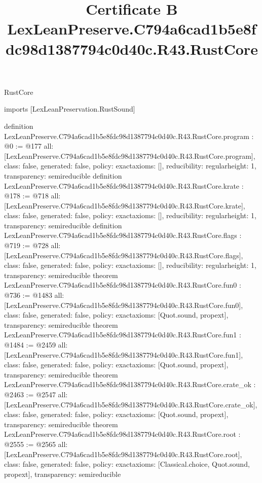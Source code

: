 \begin{lexlean}{RustCore}
\title{Certificate B LexLeanPreserve.C794a6cad1b5e8fdc98d1387794c0d40c.R43.RustCore}
\begin{coremodule}
imports [LexLeanPreservation.RustSound]

definition LexLeanPreserve.C794a6cad1b5e8fdc98d1387794c0d40c.R43.RustCore.program : @0 := @177 {
  all: [LexLeanPreserve.C794a6cad1b5e8fdc98d1387794c0d40c.R43.RustCore.program],
  class: false,
  generated: false,
  policy: exact{axioms: []},
  reducibility: regular{height: 1},
  transparency: semireducible
}
definition LexLeanPreserve.C794a6cad1b5e8fdc98d1387794c0d40c.R43.RustCore.krate : @178 := @718 {
  all: [LexLeanPreserve.C794a6cad1b5e8fdc98d1387794c0d40c.R43.RustCore.krate],
  class: false,
  generated: false,
  policy: exact{axioms: []},
  reducibility: regular{height: 1},
  transparency: semireducible
}
definition LexLeanPreserve.C794a6cad1b5e8fdc98d1387794c0d40c.R43.RustCore.flags : @719 := @728 {
  all: [LexLeanPreserve.C794a6cad1b5e8fdc98d1387794c0d40c.R43.RustCore.flags],
  class: false,
  generated: false,
  policy: exact{axioms: []},
  reducibility: regular{height: 1},
  transparency: semireducible
}
theorem LexLeanPreserve.C794a6cad1b5e8fdc98d1387794c0d40c.R43.RustCore.fun0 : @736 := @1483 {
  all: [LexLeanPreserve.C794a6cad1b5e8fdc98d1387794c0d40c.R43.RustCore.fun0],
  class: false,
  generated: false,
  policy: exact{axioms: [Quot.sound, propext]},
  transparency: semireducible
}
theorem LexLeanPreserve.C794a6cad1b5e8fdc98d1387794c0d40c.R43.RustCore.fun1 : @1484 := @2459 {
  all: [LexLeanPreserve.C794a6cad1b5e8fdc98d1387794c0d40c.R43.RustCore.fun1],
  class: false,
  generated: false,
  policy: exact{axioms: [Quot.sound, propext]},
  transparency: semireducible
}
theorem LexLeanPreserve.C794a6cad1b5e8fdc98d1387794c0d40c.R43.RustCore.crate_ok : @2463 := @2547 {
  all: [LexLeanPreserve.C794a6cad1b5e8fdc98d1387794c0d40c.R43.RustCore.crate_ok],
  class: false,
  generated: false,
  policy: exact{axioms: [Quot.sound, propext]},
  transparency: semireducible
}
theorem LexLeanPreserve.C794a6cad1b5e8fdc98d1387794c0d40c.R43.RustCore.root : @2555 := @2565 {
  all: [LexLeanPreserve.C794a6cad1b5e8fdc98d1387794c0d40c.R43.RustCore.root],
  class: false,
  generated: false,
  policy: exact{axioms: [Classical.choice, Quot.sound, propext]},
  transparency: semireducible
}


\end{coremodule}
\end{lexlean}

